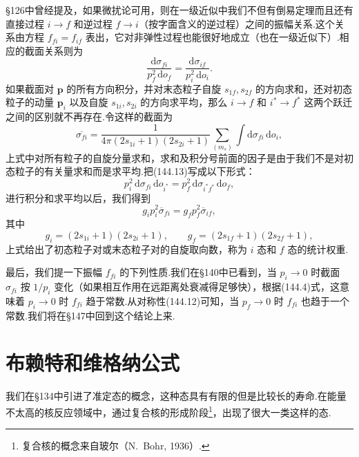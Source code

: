 §126中曾经提及，如果微扰论可用，则在一级近似中我们不但有倒易定理而且还有直接过程 $i\to f$ 和逆过程 $f\to i$（按字面含义的逆过程）之间的振幅关系.这个关系由方程 $f_{fi}=f_{if}$ 表出，它对非弹性过程也能很好地成立（也在一级近似下）.相应的截面关系则为
\begin{equation}
  \frac{\mathrm{d}\sigma_{fi}}{p_f^2\,\mathrm{d}o_f}
  =\frac{\mathrm{d}\sigma_{if}}{p_i^2\,\mathrm{d}o_i}.
\end{equation}
如果截面对 $\boldsymbol{p}$ 的所有方向积分，并对末态粒子自旋 $s_{1f},s_{2f}$ 的方向求和，还对初态粒子的动量 $\boldsymbol{p}_i$ 以及自旋 $s_{1i},s_{2i}$ 的方向求平均，那么 $i\to f$ 和 $i^{*}\to f^{*}$ 这两个跃迁之间的区别就不再存在.令这样的截面为
\begin{equation*}
  \overline{\sigma_{fi}}=\frac{1}{4\pi(2s_{1i}+1)(2s_{2i}+1)}
  \sum_{(m_s)}\int\mathrm{d}\sigma_{fi}\,\mathrm{d}o_i,
\end{equation*}
上式中对所有粒子的自旋分量求和，求和及积分号前面的因子是由于我们不是对初态粒子的有关量求和而是求平均.把(144.13)写成以下形式：
\begin{equation*}
  p_i^2\,\mathrm{d}\sigma_{fi}\,\mathrm{d}o_{i^{*}}
  =p_f^2\,\mathrm{d}\sigma_{i^{*}f^{*}}\,\mathrm{d}o_f,
\end{equation*}
进行积分和求平均以后，我们得到
\begin{equation}
  g_ip_i^2\overline{\sigma}_{fi}=g_fp_f^2\overline{\sigma}_{if},
\end{equation}
其中
\begin{equation}
  g_i=\left(2s_{1i}+1\right)\left(2s_{2i}+1\right),\qquad
  g_f=\left(2s_{1f}+1\right)\left(2s_{2f}+1\right),
\end{equation}
上式给出了初态粒子对或末态粒子对的自旋取向数，称为 $i$ 态和 $f$ 态的统计权重.

最后，我们提一下振幅 $f_{fi}$ 的下列性质.我们在§140中已看到，当 $p_i\to0$ 时截面 $\sigma_{fi}$ 按 $1/p_i$ 变化（如果相互作用在远距离处衰减得足够快），根据(144.4)式，这意味着 $p_i\to0$ 时 $f_{fi}$ 趋于常数.从对称性(144.12)可知，当 $p_f\to0$ 时 $f_{fi}$ 也趋于一个常数.我们将在§147中回到这个结论上来.

\section{布赖特和维格纳公式}

我们在§134中引进了准定态的概念，这种态具有有限的但是比较长的寿命.在能量不太高的核反应领域中，通过复合核的形成阶段\footnote{复合核的概念来自玻尔（N.~Bohr, 1936）.}，出现了很大一类这样的态.

